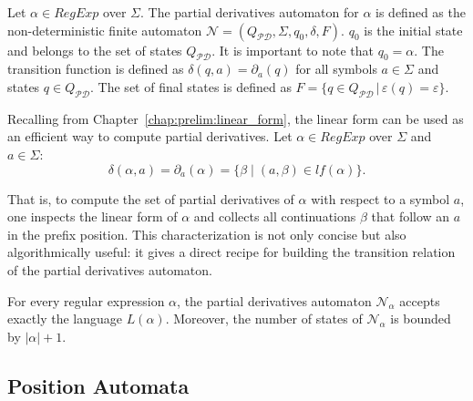 \begin{defn}
	Let $\alpha \in RegExp$ over $\Sigma$. The partial derivatives automaton for $\alpha$ is defined as the non-deterministic finite automaton $\mathcal{N} = (Q_{\mathcal{PD}}, \Sigma, q_0, \delta, F)$. $q_0$ is the initial state and belongs to the set of states $Q_{\mathcal{PD}}$. It is important to note that $q_0 = \alpha$. The transition function is defined as $\delta(q,a) = \partial_a(q)$ for all symbols $a \in \Sigma$ and states $q \in Q_{\mathcal{PD}}$. The set of final states is defined as $F = \{ q \in Q_{\mathcal{PD}} \, | \, \varepsilon(q) = \varepsilon \}$.
\end{defn}

Recalling from Chapter~\ref{chap:prelim:linear_form}, the linear form can be used as an efficient way to compute partial derivatives.
Let $\alpha \in RegExp$ over $\Sigma$ and $a \in \Sigma$:
\[
\delta(\alpha, a) = \partial_a(\alpha) = \{ \beta \mid (a,\beta) \in lf(\alpha) \}.
\]

That is, to compute the set of partial derivatives of $\alpha$ with respect to a symbol $a$, one inspects the linear form of $\alpha$ and collects all continuations $\beta$ that follow an $a$ in the prefix position. This characterization is not only concise but also algorithmically useful: it gives a direct recipe for building the transition relation of the partial derivatives automaton.

\begin{thm}
	For every regular expression $\alpha$, the partial derivatives automaton $\mathcal{N}_\alpha$ accepts exactly the language $L(\alpha)$. Moreover, the number of states of $\mathcal{N}_\alpha$ is bounded by $|\alpha|+1$.
\end{thm}



\subsection{Position Automata}
\label{chap:prelim:pos_auto}


